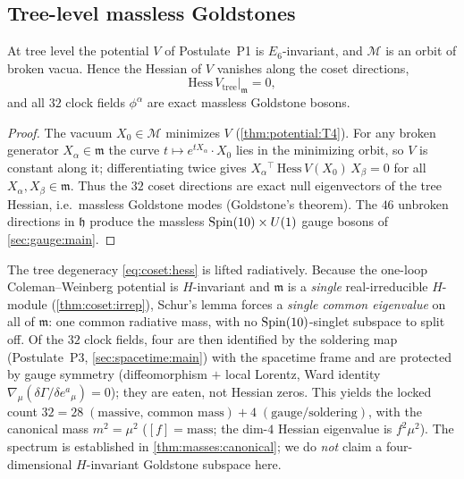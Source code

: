 \subsection{Tree-level massless Goldstones}
\label{sec:coset:goldstone}

\begin{theorem}\label{thm:coset:goldstone}
At tree level the potential $V$ of Postulate~P1 is $E_{6}$-invariant, and
$\mathcal M$ is an orbit of broken vacua. Hence the Hessian of $V$ vanishes
along the coset directions,
\begin{equation}\label{eq:coset:hess}
  \mathrm{Hess}\,V_{\mathrm{tree}}\big|_{\mathfrak m} = 0,
\end{equation}
and all $32$ clock fields $\phi^{\alpha}$ are exact massless Goldstone bosons.
\end{theorem}

\begin{proof}
The vacuum $X_{0}\in\mathcal M$ minimizes $V$ (\autoref{thm:potential:T4}). For any
broken generator $X_{\alpha}\in\mathfrak m$ the curve
$t\mapsto e^{tX_{\alpha}}\!\cdot X_{0}$ lies in the minimizing orbit, so $V$ is
constant along it; differentiating twice gives
$X_{\alpha}{}^{\!\top}\,\mathrm{Hess}\,V(X_{0})\,X_{\beta}=0$ for all
$X_{\alpha},X_{\beta}\in\mathfrak m$. Thus the $32$ coset directions are exact
null eigenvectors of the tree Hessian, i.e.\ massless Goldstone modes
(Goldstone's theorem). The $46$ unbroken directions in $\mathfrak h$ produce the
massless $\operatorname{Spin}(10)\times U(1)$ gauge bosons of \autoref{sec:gauge:main}.
\end{proof}

\begin{remark}\label{rem:coset:loop}
The tree degeneracy \eqref{eq:coset:hess} is lifted radiatively. Because the
one-loop Coleman--Weinberg potential is $H$-invariant and $\mathfrak m$ is a
\emph{single} real-irreducible $H$-module (\autoref{thm:coset:irrep}), Schur's
lemma forces a \emph{single common eigenvalue} on all of $\mathfrak m$: one
common radiative mass, with no $\operatorname{Spin}(10)$-singlet subspace to split off. Of the
$32$ clock fields, four are then identified by the soldering map (Postulate~P3,
\autoref{sec:spacetime:main}) with the spacetime frame and are protected by gauge
symmetry (diffeomorphism $+$ local Lorentz, Ward identity
$\nabla_{\mu}(\delta\Gamma/\delta e^{a}{}_{\mu})=0$); they are eaten, not Hessian
zeros. This yields the locked count $32 = 28\;(\text{massive, common mass})
+ 4\;(\text{gauge/soldering})$, with the canonical mass $m^{2}=\mu^{2}$
($[f]=\text{mass}$; the dim-$4$ Hessian eigenvalue is $f^{2}\mu^{2}$). The
spectrum is established in \autoref{thm:masses:canonical}; we do \emph{not} claim a
four-dimensional $H$-invariant Goldstone subspace here.
\end{remark}

